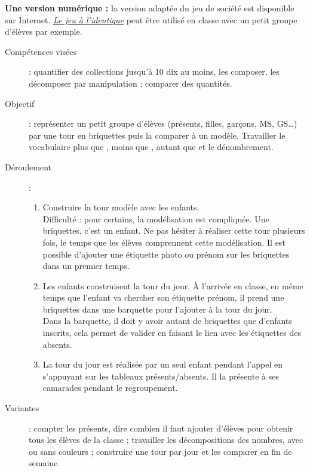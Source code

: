 \begin{exercice*}
{\bf Une version numérique :} la version adaptée du jeu de société est disponible sur Internet. \href{https://micetf.fr/embouteillages/}{\it\blue Le jeu à l'identique} peut être utilisé en classe avec un petit groupe d'élèves par exemple.
\end{exercice*}

\pagebreak


\begin{exercice*} %
   \begin{description}
      \item[Compétences visées] : quantifier des collections jusqu'à 10 dix au moins, les composer, les décomposer par manipulation ; comparer des quantités.
      \item[Objectif] : représenter un petit groupe d'élèves (présents, filles, garçons, MS, GS\dots) par une tour en briquettes puis la comparer à un modèle. Travailler le vocabulaire \og plus que \fg,  \og moins que \fg, \og autant que \fg{} et le dénombrement.
      \item[Déroulement] :
         \begin{enumerate}
            \item Construire la tour modèle avec les enfants. \\
            Difficulté : pour certains, la modélisation est compliquée. Une briquettes, c’est un enfant. Ne pas hésiter à réaliser cette tour plusieurs fois, le temps que les élèves comprennent cette modélisation. Il est possible d'ajouter une étiquette photo ou prénom sur les briquettes dans un premier temps.
            \item Les enfants construisent la tour du jour. À l’arrivée en classe, en même temps que l’enfant va chercher son étiquette prénom, il prend une briquettes dans une barquette pour l’ajouter à la tour du jour. \\
            Dans la barquette, il doit y avoir autant de briquettes que d’enfants inscrits, cela permet de valider en faisant le lien avec les étiquettes des absents.
            \item La tour du jour est réalisée par un seul enfant pendant l’appel en s’appuyant sur les tableaux présents/absents. Il la présente à ses camarades pendant le regroupement.
         \end{enumerate}
      \item[Variantes] : compter les présents, dire combien il faut ajouter d'élèves pour obtenir tous les élèves de la classe ; travailler les décompositions des nombres, avec ou sans couleurs ; construire une tour par jour et les comparer en fin de semaine.

\end{description}
\end{exercice*}
